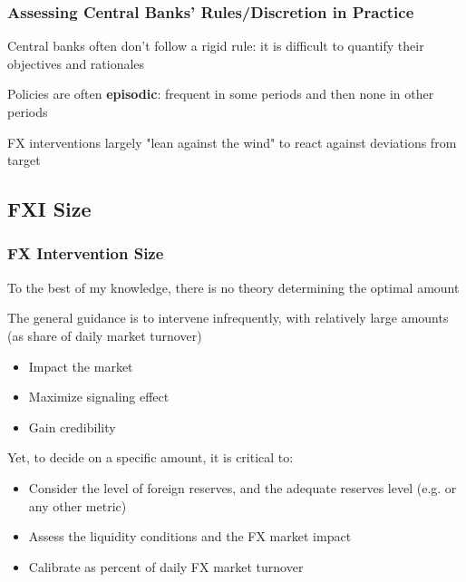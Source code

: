 \documentclass{beamer}
\newenvironment{wideitemize}{\itemize\addtolength{\itemsep}{10pt}}{\enditemize}
\begin{document}
\begin{frame}
  \frametitle{Assessing Central Banks' Rules/Discretion in Practice}
  \begin{wideitemize}
    \item Central banks often don't follow a rigid rule: it is difficult to quantify their objectives and rationales
    \item Policies are often \textbf{episodic}: frequent in some periods and then none in other periods
    \item FX interventions largely "lean against the wind" to react against deviations from target
  \end{wideitemize}  
\end{frame}


\subsection{FXI Size}
\begin{frame}
  \frametitle{FX Intervention Size}
  \begin{wideitemize}
  \item To the best of my knowledge, there is no theory determining the optimal amount
  \item The general guidance is to intervene infrequently, with relatively large amounts (as share of daily market turnover)
    \begin{itemize}
    \item Impact the market
    \item Maximize signaling effect
    \item Gain credibility
    \end{itemize}
  \item Yet, to decide on a specific amount, it is critical to:
    \begin{itemize}
    \item Consider the level of foreign reserves, and the adequate reserves level (e.g. \href{https://www.imf.org/external/datamapper/datasets/ARA}{} or any other metric)
    \item Assess the liquidity conditions and the FX market impact
    \item Calibrate as percent of daily FX market turnover      
    \end{itemize}
  \end{wideitemize}
\end{frame}
\end{document}
